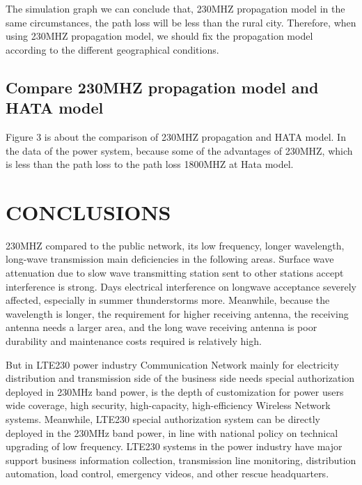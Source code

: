 \documentclass[12pt,a4paper,twocolumn,fleqn]{narms}
\begin{document}
{The simulation graph we can conclude that, 230MHZ propagation model in the same circumstances, the path loss will be less than the rural city. Therefore, when using 230MHZ propagation model, we should fix the propagation model according to  the different geographical conditions.


\subsection{Compare 230MHZ propagation model and HATA model}

Figure 3 is about  the comparison of 230MHZ propagation and HATA model. In the data of the power system, because some of the advantages of 230MHZ, which is less than the path loss to the path loss 1800MHZ at Hata model.





\section{CONCLUSIONS}

230MHZ compared to the public network, its low frequency, longer wavelength, long-wave transmission main deficiencies in the following areas. Surface wave attenuation due to slow wave transmitting station sent to other stations accept interference is strong. Days electrical interference on longwave acceptance severely affected, especially in summer thunderstorms more. Meanwhile, because the wavelength is longer, the requirement for higher receiving antenna, the receiving antenna needs a larger area, and the long wave receiving antenna is poor durability and maintenance costs required is relatively high.

But in LTE230 power industry Communication Network mainly for electricity distribution and transmission side of the business side needs special authorization deployed in 230MHz band power, is the depth of customization for power users wide coverage, high security, high-capacity, high-efficiency Wireless Network systems. Meanwhile, LTE230 special authorization system can be directly deployed in the 230MHz band power, in line with national policy on technical upgrading of low frequency. LTE230 systems in the power industry have major support business information collection, transmission line monitoring, distribution automation, load control, emergency videos, and other rescue headquarters. 

}
\end{document}
